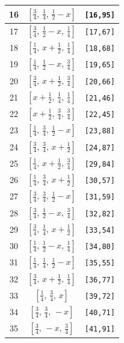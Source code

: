 \documentclass[fleqn,8pt]{jsarticle}
\begin{document}
\begin{longtable}{ccc}
16 & $\left[ \frac{3}{4},\, \frac{1}{4},\, \frac{1}{2} - x \right]$ & {\tt [16,95]} \\ \hline
17 & $\left[ \frac{3}{4},\, \frac{1}{2} - x,\, \frac{1}{4} \right]$ & {\tt [17,67]} \\ \hline
18 & $\left[ \frac{1}{4},\, x + \frac{1}{2},\, \frac{1}{4} \right]$ & {\tt [18,68]} \\ \hline
19 & $\left[ \frac{1}{4},\, \frac{1}{2} - x,\, \frac{3}{4} \right]$ & {\tt [19,65]} \\ \hline
20 & $\left[ \frac{3}{4},\, x + \frac{1}{2},\, \frac{3}{4} \right]$ & {\tt [20,66]} \\ \hline
21 & $\left[ x + \frac{1}{2},\, \frac{1}{4},\, \frac{1}{4} \right]$ & {\tt [21,46]} \\ \hline
22 & $\left[ x + \frac{1}{2},\, \frac{3}{4},\, \frac{3}{4} \right]$ & {\tt [22,45]} \\ \hline
23 & $\left[ \frac{1}{4},\, \frac{3}{4},\, \frac{1}{2} - x \right]$ & {\tt [23,88]} \\ \hline
24 & $\left[ \frac{3}{4},\, \frac{3}{4},\, x + \frac{1}{2} \right]$ & {\tt [24,87]} \\ \hline
25 & $\left[ \frac{1}{4},\, x + \frac{1}{2},\, \frac{3}{4} \right]$ & {\tt [29,84]} \\ \hline
26 & $\left[ \frac{1}{4},\, \frac{3}{4},\, x + \frac{1}{2} \right]$ & {\tt [30,57]} \\ \hline
27 & $\left[ \frac{3}{4},\, \frac{3}{4},\, \frac{1}{2} - x \right]$ & {\tt [31,59]} \\ \hline
28 & $\left[ \frac{3}{4},\, \frac{1}{2} - x,\, \frac{3}{4} \right]$ & {\tt [32,82]} \\ \hline
29 & $\left[ \frac{3}{4},\, \frac{1}{4},\, x + \frac{1}{2} \right]$ & {\tt [33,54]} \\ \hline
30 & $\left[ \frac{1}{4},\, \frac{1}{2} - x,\, \frac{1}{4} \right]$ & {\tt [34,80]} \\ \hline
31 & $\left[ \frac{1}{4},\, \frac{1}{4},\, \frac{1}{2} - x \right]$ & {\tt [35,55]} \\ \hline
32 & $\left[ \frac{3}{4},\, x + \frac{1}{2},\, \frac{1}{4} \right]$ & {\tt [36,77]} \\ \hline
33 & $\left[ \frac{1}{4},\, \frac{3}{4},\, x \right]$ & {\tt [39,72]} \\ \hline
34 & $\left[ \frac{3}{4},\, \frac{3}{4},\, - x \right]$ & {\tt [40,71]} \\ \hline
35 & $\left[ \frac{3}{4},\, - x,\, \frac{3}{4} \right]$ & {\tt [41,91]} \\ \hline

\end{longtable}
\end{document}
